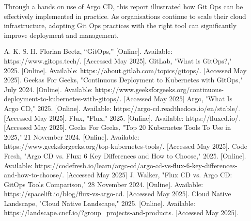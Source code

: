 \documentclass[conference]{IEEEtran}
\begin{document}
Through a hands on use of Argo CD, this report illustrated how Git Ops can be effectively implemented in practice. As organisations continue to scale their cloud infrastructure, adopting Git Ops practices with the right tool can significantly improve deployment and management.

\begin{thebibliography}{00}
A. K. S. H. Florian Beetz, “GitOps,” [Online]. Available: https://www.gitops.tech/. [Accessed May 2025].
GitLab, "What is GitOps?," 2025. [Online]. Available: https://about.gitlab.com/topics/gitops/. [Accessed May 2025].
Geekas For Geeks, "Continuous Deployment to Kubernetes with GitOps," July 2024. [Online]. Available: https://www.geeksforgeeks.org/continuous-deployment-to-kubernetes-with-gitops/. [Accessed May 2025]
Argo, "What Is Argo CD," 2025. [Online]. Available: https://argo-cd.readthedocs.io/en/stable/. [Accessed May 2025].
Flux, "Flux," 2025. [Online]. Available: https://fluxcd.io/. [Accessed May 2025].
Geeks For Geeks, "Top 20 Kubernetes Tools To Use in 2025," 21 November 2024. [Online]. Available: https://www.geeksforgeeks.org/top-kubernetes-tools/. [Accessed May 2025].
Code Fresh, "Argo CD vs. Flux: 6 Key Differences and How to Choose," 2025. [Online]. Available: https://codefresh.io/learn/argo-cd/argo-cd-vs-flux-6-key-differences-and-how-to-choose/. [Accessed May 2025]
J. Walker, "Flux CD vs. Argo CD: GitOps Tools Comparison," 28 November 2024. [Online]. Available: https://spacelift.io/blog/flux-vs-argo-cd. [Accessed May 2025].
Cloud Native Landscape, "Cloud Native Landscape," 2025. [Online]. Available: https://landscape.cncf.io/?group=projects-and-products. [Accessed May 2025].
\end{thebibliography}
\vspace{12pt}
\end{document}

